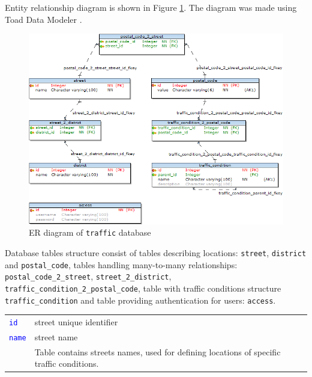 Entity relationship diagram is shown in Figure \ref{fig:erd}. The diagram was made using Toad Data Modeler \cite{CasestudioHome}.

\medskip

\begin{figure}[htp]
\centering
\includegraphics[scale=0.7]{images/chapter4/ERD}
\caption{ER diagram of \texttt{traffic} database}
\label{fig:erd}
\end{figure}

\noindent Database tables structure consist of tables describing locations: \texttt{street}, \texttt{district} and \texttt{postal\_code}, tables handling many-to-many relationships: \texttt{postal\_code\_2\_street}, \texttt{street\_2\_district}, \texttt{traffic\_condition\_2\_postal\_code}, table with traffic conditions structure \texttt{traffic\_condition} and table providing authentication for users: \texttt{access}.

\newpage

\begin{tabularx}{\textwidth}{X>{\hsize=10.5cm}X}
    \vtop{\vskip 0pt \vskip -\ht\strutbox 
    \begin{tabular}{|l|l|}
        \hline
        \multicolumn{2}{|c|}{\texttt{street}} \\
        \hline 
        \textcolor{blue}{\texttt{id}} & street unique identifier \\
        \textcolor{blue}{\texttt{name}} & street name \\
        \hline
    \end{tabular}
    \vskip -\dp\strutbox }%
    & Table contains streets names, used for defining locations of specific traffic conditions. \\  
\end{tabularx} 


